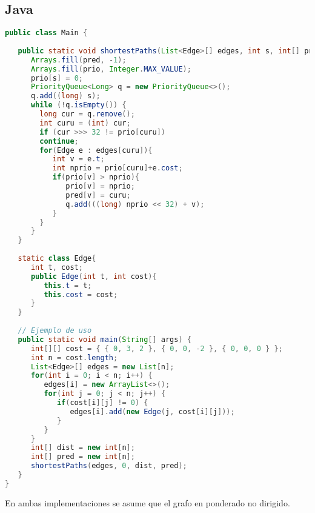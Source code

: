 \subsection{Java}

\begin{lstlisting}[language=Java]
public class Main {
	
   public static void shortestPaths(List<Edge>[] edges, int s, int[] prio, int[] pred){
      Arrays.fill(pred, -1);
      Arrays.fill(prio, Integer.MAX_VALUE);
      prio[s] = 0;
      PriorityQueue<Long> q = new PriorityQueue<>();
      q.add((long) s);
      while (!q.isEmpty()) {
      	long cur = q.remove();
      	int curu = (int) cur;
        if (cur >>> 32 != prio[curu])
        continue;
        for(Edge e : edges[curu]){
           int v = e.t;
           int nprio = prio[curu]+e.cost;
           if(prio[v] > nprio){
              prio[v] = nprio;
              pred[v] = curu;
              q.add(((long) nprio << 32) + v);
           }
        }
      }
   }
	
   static class Edge{
      int t, cost;
      public Edge(int t, int cost){
         this.t = t;
         this.cost = cost;
      }
   }
	
   // Ejemplo de uso
   public static void main(String[] args) {
      int[][] cost = { { 0, 3, 2 }, { 0, 0, -2 }, { 0, 0, 0 } };
      int n = cost.length;
      List<Edge>[] edges = new List[n];
      for(int i = 0; i < n; i++) {
         edges[i] = new ArrayList<>();
         for(int j = 0; j < n; j++) {
            if(cost[i][j] != 0) {
               edges[i].add(new Edge(j, cost[i][j]));
            }
         }
      }
      int[] dist = new int[n];
      int[] pred = new int[n];
      shortestPaths(edges, 0, dist, pred);
   }
}
\end{lstlisting}

En ambas implementaciones se asume que el grafo en ponderado no dirigido.